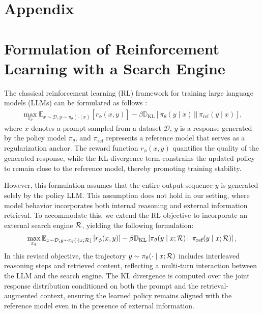 \newpage

\appendix


\section*{Appendix}

\section{Formulation of Reinforcement Learning with a Search Engine}\label{sec:apx:rl-formulation}

The classical reinforcement learning (RL) framework for training large language models (LLMs) can be formulated as follows \citep{rafailov2023direct,ouyang2022training}:
\begin{gather}\label{apx:eq:rl-llm}
    \max_{\pi_\theta} \mathbb{E}_{x \sim \mathcal{D}, y \sim \pi_{\theta}(\cdot \mid x)} 
\left[ r_{\phi}(x, y) \right] 
- \beta \mathbb{D}_{\text{KL}} \left[ \pi_{\theta}(y \mid x) \,||\, \pi_{\text{ref}}(y \mid x) \right],
\end{gather}
where $x$ denotes a prompt sampled from a dataset $\mathcal{D}$, $y$ is a response generated by the policy model $\pi_\theta$, and $\pi_{\text{ref}}$ represents a reference model that serves as a regularization anchor. The reward function $r_{\phi}(x, y)$ quantifies the quality of the generated response, while the KL divergence term constrains the updated policy to remain close to the reference model, thereby promoting training stability.

However, this formulation assumes that the entire output sequence $y$ is generated solely by the policy LLM. This assumption does not hold in our setting, where model behavior incorporates both internal reasoning and external information retrieval. To accommodate this, we extend the RL objective to incorporate an external search engine $\mathcal{R}$, yielding the following formulation:
\begin{gather}\label{apx:eq:rl-retriever}
    \max_{\pi_\theta} \mathbb{E}_{x \sim \mathcal{D}, y \sim \pi_{\theta}(\cdot \mid x; \mathcal{R})} 
\left[ r_{\phi}(x, y) \right] 
- \beta \mathbb{D}_{\text{KL}} \left[ \pi_{\theta}(y \mid x; \mathcal{R}) \,||\, \pi_{\text{ref}}(y \mid x; \mathcal{R}) \right],
\end{gather}
In this revised objective, the trajectory $y \sim \pi_{\theta}(\cdot \mid x; \mathcal{R})$ includes interleaved reasoning steps and retrieved content, reflecting a multi-turn interaction between the LLM and the search engine. The KL divergence is computed over the joint response distribution conditioned on both the prompt and the retrieval-augmented context, ensuring the learned policy remains aligned with the reference model even in the presence of external information.

